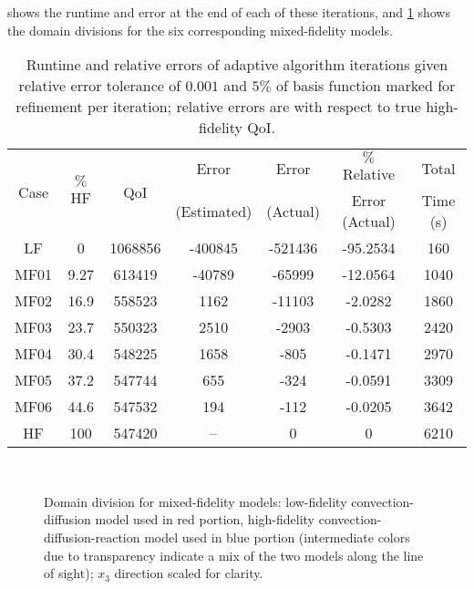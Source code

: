  shows the runtime and error at the end of each of these iterations, and \cref{fig:divvy3D_dainty} shows the domain divisions for the six corresponding mixed-fidelity models.
%
\begin{table}
\caption{Runtime and relative errors of adaptive algorithm iterations given relative error tolerance of $0.001$ and $5\%$ of basis function marked for refinement per iteration; relative errors are with respect to true high-fidelity QoI.}
\label{tab:ref3D_dainty}
\centering
\begin{tabular}{|c|c|c|c|c|c|c|}
\hline
\multirow{2}{*}{Case} & \multirow{2}{*}{$\%$HF} & \multirow{2}{*}{QoI} & Error & Error & $\%$ Relative & Total \\ 
& & & (Estimated) & (Actual) & Error (Actual) & Time (s) \\ \hline
LF   & 0    & 1068856 & -400845 & -521436 & -95.2534 & 160 \\
MF01 & 9.27 & 613419  & -40789  & -65999  & -12.0564 & 1040 \\
MF02 & 16.9 & 558523  & 1162    & -11103  & -2.0282  & 1860 \\
MF03 & 23.7 & 550323  & 2510    & -2903   & -0.5303  & 2420 \\
MF04 & 30.4 & 548225  & 1658    & -805    & -0.1471  & 2970 \\
MF05 & 37.2 & 547744  & 655     & -324    & -0.0591  & 3309 \\
MF06 & 44.6 & 547532  & 194     & -112    & -0.0205  & 3642 \\ %
HF   & 100  & 547420  & --      & 0       & 0        & 6210 \\ \hline
\end{tabular}
\end{table}
%
\begin{figure}[htbp]
\centering
{}
 \\
\caption{Domain division for mixed-fidelity models: low-fidelity convection-diffusion model used in red portion, high-fidelity convection-diffusion-reaction model used in blue portion (intermediate colors due to transparency indicate a mix of the two models along the line of sight); $x_3$ direction scaled for clarity.}
\label{fig:divvy3D_dainty}
\end{figure} 
